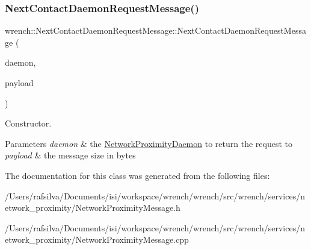 \subsubsection{\texorpdfstring{Next\+Contact\+Daemon\+Request\+Message()}{NextContactDaemonRequestMessage()}}
{\footnotesize\ttfamily wrench\+::\+Next\+Contact\+Daemon\+Request\+Message\+::\+Next\+Contact\+Daemon\+Request\+Message (\begin{DoxyParamCaption}\item[{\hyperlink{classwrench_1_1_network_proximity_daemon}{Network\+Proximity\+Daemon} $\ast$}]{daemon,  }\item[{double}]{payload }\end{DoxyParamCaption})}



Constructor. 


\begin{DoxyParams}{Parameters}
{\em daemon} & the \hyperlink{classwrench_1_1_network_proximity_daemon}{Network\+Proximity\+Daemon} to return the request to \\
\hline
{\em payload} & the message size in bytes \\
\hline
\end{DoxyParams}


The documentation for this class was generated from the following files\+:\begin{DoxyCompactItemize}
\item 
/\+Users/rafsilva/\+Documents/isi/workspace/wrench/wrench/src/wrench/services/network\+\_\+proximity/Network\+Proximity\+Message.\+h\item 
/\+Users/rafsilva/\+Documents/isi/workspace/wrench/wrench/src/wrench/services/network\+\_\+proximity/Network\+Proximity\+Message.\+cpp\end{DoxyCompactItemize}
